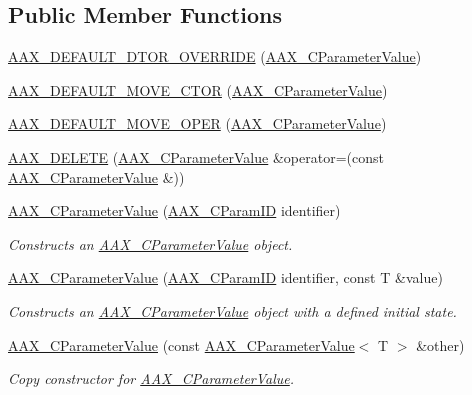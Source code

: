 \subsection*{Public Member Functions}
\begin{DoxyCompactItemize}
\item 
\mbox{\hyperlink{a01533_a9675ff46af04ba73e9ee0dbedabff53e}{A\+A\+X\+\_\+\+D\+E\+F\+A\+U\+L\+T\+\_\+\+D\+T\+O\+R\+\_\+\+O\+V\+E\+R\+R\+I\+DE}} (\mbox{\hyperlink{a01533}{A\+A\+X\+\_\+\+C\+Parameter\+Value}})
\item 
\mbox{\hyperlink{a01533_aeeaf69b0c6c9bb83911b9e160b3b7c7f}{A\+A\+X\+\_\+\+D\+E\+F\+A\+U\+L\+T\+\_\+\+M\+O\+V\+E\+\_\+\+C\+T\+OR}} (\mbox{\hyperlink{a01533}{A\+A\+X\+\_\+\+C\+Parameter\+Value}})
\item 
\mbox{\hyperlink{a01533_a04b9dbdf97b7b3d3e33286ade8d2f2fb}{A\+A\+X\+\_\+\+D\+E\+F\+A\+U\+L\+T\+\_\+\+M\+O\+V\+E\+\_\+\+O\+P\+ER}} (\mbox{\hyperlink{a01533}{A\+A\+X\+\_\+\+C\+Parameter\+Value}})
\item 
\mbox{\hyperlink{a01533_ac63dcc7a4774d7518e9651dda9012c2e}{A\+A\+X\+\_\+\+D\+E\+L\+E\+TE}} (\mbox{\hyperlink{a01533}{A\+A\+X\+\_\+\+C\+Parameter\+Value}} \&operator=(const \mbox{\hyperlink{a01533}{A\+A\+X\+\_\+\+C\+Parameter\+Value}} \&))
\item 
\mbox{\hyperlink{a01533_ac4f0d65eb080c32073138f5a1fa833d1}{A\+A\+X\+\_\+\+C\+Parameter\+Value}} (\mbox{\hyperlink{a00392_a1440c756fe5cb158b78193b2fc1780d1}{A\+A\+X\+\_\+\+C\+Param\+ID}} identifier)
\begin{DoxyCompactList}\small\item\em Constructs an \mbox{\hyperlink{a01533}{A\+A\+X\+\_\+\+C\+Parameter\+Value}} object. \end{DoxyCompactList}\item 
\mbox{\hyperlink{a01533_a7d1e7a3e8977f19e70c468a6ca60f5ca}{A\+A\+X\+\_\+\+C\+Parameter\+Value}} (\mbox{\hyperlink{a00392_a1440c756fe5cb158b78193b2fc1780d1}{A\+A\+X\+\_\+\+C\+Param\+ID}} identifier, const T \&value)
\begin{DoxyCompactList}\small\item\em Constructs an \mbox{\hyperlink{a01533}{A\+A\+X\+\_\+\+C\+Parameter\+Value}} object with a defined initial state. \end{DoxyCompactList}\item 
\mbox{\hyperlink{a01533_a7da2ed60a10806f3c41b69ba15c9af0a}{A\+A\+X\+\_\+\+C\+Parameter\+Value}} (const \mbox{\hyperlink{a01533}{A\+A\+X\+\_\+\+C\+Parameter\+Value}}$<$ T $>$ \&other)
\begin{DoxyCompactList}\small\item\em Copy constructor for \mbox{\hyperlink{a01533}{A\+A\+X\+\_\+\+C\+Parameter\+Value}}. \end{DoxyCompactList}\item 

\end{DoxyCompactItemize}
